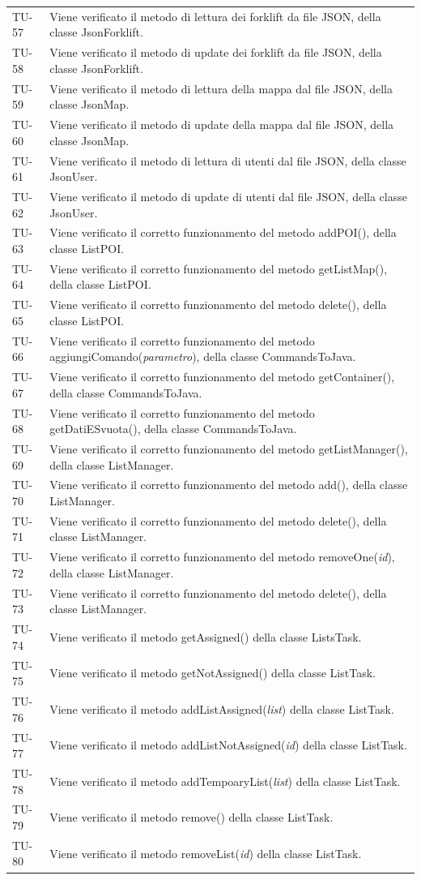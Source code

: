 \begin{longtable}{ >{\centering}p{} >{}p{}}
	TU-57 & Viene verificato il metodo di lettura dei forklift da file JSON, della classe JsonForklift. \tabularnewline
	TU-58 & Viene verificato il metodo di update dei forklift da file JSON, della classe JsonForklift. \tabularnewline
	TU-59 & Viene verificato il metodo di lettura della mappa dal file JSON, della classe JsonMap. \tabularnewline
	TU-60 & Viene verificato il metodo di update della mappa dal file JSON, della classe JsonMap. \tabularnewline
	TU-61 & Viene verificato il metodo di lettura di utenti dal file JSON, della classe JsonUser. \tabularnewline
	TU-62 & Viene verificato il metodo di update di utenti dal file JSON, della classe JsonUser. \tabularnewline
	TU-63 & Viene verificato il corretto funzionamento del metodo addPOI(), della classe ListPOI. \tabularnewline
	TU-64 & Viene verificato il corretto funzionamento del metodo getListMap(), della classe ListPOI. \tabularnewline
	TU-65 & Viene verificato il corretto funzionamento del metodo delete(), della classe ListPOI. \tabularnewline
	TU-66 & Viene verificato il corretto funzionamento del metodo aggiungiComando(\textit{parametro}), della classe CommandsToJava. \tabularnewline
	TU-67 & Viene verificato il corretto funzionamento del metodo getContainer(), della classe CommandsToJava. \tabularnewline
	TU-68 & Viene verificato il corretto funzionamento del metodo getDatiESvuota(), della classe CommandsToJava. \tabularnewline
	TU-69 & Viene verificato il corretto funzionamento del metodo getListManager(), della classe ListManager. \tabularnewline
	TU-70 & Viene verificato il corretto funzionamento del metodo add(), della classe ListManager. \tabularnewline
	TU-71 & Viene verificato il corretto funzionamento del metodo delete(), della classe ListManager. \tabularnewline
	TU-72 & Viene verificato il corretto funzionamento del metodo removeOne(\textit{id}), della classe ListManager. \tabularnewline
	TU-73 & Viene verificato il corretto funzionamento del metodo delete(), della classe ListManager. \tabularnewline
	TU-74 & Viene verificato il metodo getAssigned() della classe ListsTask. \tabularnewline
	TU-75 & Viene verificato il metodo getNotAssigned() della classe ListTask. \tabularnewline
	TU-76 & Viene verificato il metodo addListAssigned(\textit{list}) della classe ListTask. \tabularnewline
	TU-77 & Viene verificato il metodo addListNotAssigned(\textit{id}) della classe ListTask. \tabularnewline
	TU-78 & Viene verificato il metodo addTempoaryList(\textit{list}) della classe ListTask. \tabularnewline
	TU-79 & Viene verificato il metodo remove() della classe ListTask. \tabularnewline
	TU-80 & Viene verificato il metodo removeList(\textit{id}) della classe ListTask. \tabularnewline

\end{longtable}

